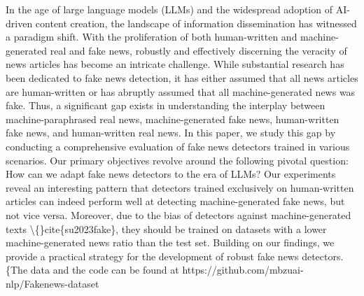 In the age of large language models (LLMs) and the widespread adoption of AI-driven content creation, the landscape of information dissemination has witnessed a paradigm shift. With the proliferation of both human-written and machine-generated real and fake news, robustly and effectively discerning the veracity of news articles has become an intricate challenge. While substantial research has been dedicated to fake news detection, it has either assumed that all news articles are human-written or has abruptly assumed that all machine-generated news was fake. Thus, a significant gap exists in understanding the interplay between machine-paraphrased real news, machine-generated fake news, human-written fake news, and human-written real news. In this paper, we study this gap by conducting a comprehensive evaluation of fake news detectors trained in various scenarios. Our primary objectives revolve around the following pivotal question: How can we adapt fake news detectors to the era of LLMs? Our experiments reveal an interesting pattern that detectors trained exclusively on human-written articles can indeed perform well at detecting machine-generated fake news, but not vice versa. Moreover, due to the bias of detectors against machine-generated texts \textbackslash\{\}cite\{su2023fake\}, they should be trained on datasets with a lower machine-generated news ratio than the test set. Building on our findings, we provide a practical strategy for the development of robust fake news detectors. \{The data and the code can be found at https://github.com/mbzuai-nlp/Fakenews-dataset
